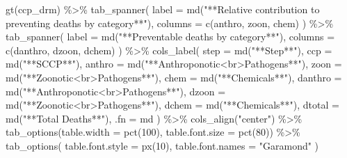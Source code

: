 \documentclass[
  letterpaper,
  DIV=11,
  numbers=noendperiod]{scrartcl}
\newenvironment{Shaded}{\begin{snugshade}}{\end{snugshade}}
\newcommand{\AttributeTok}[1]{\textcolor[rgb]{0.40,0.45,0.13}{#1}}
\newcommand{\DecValTok}[1]{\textcolor[rgb]{0.68,0.00,0.00}{#1}}
\newcommand{\FunctionTok}[1]{\textcolor[rgb]{0.28,0.35,0.67}{#1}}
\newcommand{\NormalTok}[1]{\textcolor[rgb]{0.00,0.23,0.31}{#1}}
\newcommand{\SpecialCharTok}[1]{\textcolor[rgb]{0.37,0.37,0.37}{#1}}
\newcommand{\StringTok}[1]{\textcolor[rgb]{0.13,0.47,0.30}{#1}}
\begin{document}
\begin{Shaded}
\begin{Highlighting}[]
\FunctionTok{gt}\NormalTok{(ccp\_drm) }\SpecialCharTok{\%\textgreater{}\%} 
  \FunctionTok{tab\_spanner}\NormalTok{(}
    \AttributeTok{label =} \FunctionTok{md}\NormalTok{(}\StringTok{"**Relative contribution to preventing deaths by category**"}\NormalTok{),}
    \AttributeTok{columns =} \FunctionTok{c}\NormalTok{(anthro, zoon, chem)}
\NormalTok{  ) }\SpecialCharTok{\%\textgreater{}\%} 
  \FunctionTok{tab\_spanner}\NormalTok{(}
  \AttributeTok{label =} \FunctionTok{md}\NormalTok{(}\StringTok{"**Preventable deaths by category**"}\NormalTok{),}
  \AttributeTok{columns =} \FunctionTok{c}\NormalTok{(danthro, dzoon, dchem)}
\NormalTok{  ) }\SpecialCharTok{\%\textgreater{}\%} 
  \FunctionTok{cols\_label}\NormalTok{(}
\AttributeTok{step =} \FunctionTok{md}\NormalTok{(}\StringTok{"**Step**"}\NormalTok{),}
\AttributeTok{ccp =} \FunctionTok{md}\NormalTok{(}\StringTok{"**SCCP**"}\NormalTok{),}
\AttributeTok{anthro =} \FunctionTok{md}\NormalTok{(}\StringTok{"**Anthroponotic\textless{}br\textgreater{}Pathogens**"}\NormalTok{),}
\AttributeTok{zoon =} \FunctionTok{md}\NormalTok{(}\StringTok{"**Zoonotic\textless{}br\textgreater{}Pathogens**"}\NormalTok{),}
\AttributeTok{chem =} \FunctionTok{md}\NormalTok{(}\StringTok{"**Chemicals**"}\NormalTok{),}
\AttributeTok{danthro =} \FunctionTok{md}\NormalTok{(}\StringTok{"**Anthroponotic\textless{}br\textgreater{}Pathogens**"}\NormalTok{),}
\AttributeTok{dzoon =} \FunctionTok{md}\NormalTok{(}\StringTok{"**Zoonotic\textless{}br\textgreater{}Pathogens**"}\NormalTok{),}
\AttributeTok{dchem =} \FunctionTok{md}\NormalTok{(}\StringTok{"**Chemicals**"}\NormalTok{),}
\AttributeTok{dtotal =} \FunctionTok{md}\NormalTok{(}\StringTok{"**Total Deaths**"}\NormalTok{),}
\AttributeTok{.fn =}\NormalTok{ md}
\NormalTok{) }\SpecialCharTok{\%\textgreater{}\%} 
  \FunctionTok{cols\_align}\NormalTok{(}\StringTok{"center"}\NormalTok{) }\SpecialCharTok{\%\textgreater{}\%} 
\FunctionTok{tab\_options}\NormalTok{(}\AttributeTok{table.width =} \FunctionTok{pct}\NormalTok{(}\DecValTok{100}\NormalTok{), }\AttributeTok{table.font.size =} \FunctionTok{pct}\NormalTok{(}\DecValTok{80}\NormalTok{)) }\SpecialCharTok{\%\textgreater{}\%} 
  \FunctionTok{tab\_options}\NormalTok{(}
    \AttributeTok{table.font.style =} \FunctionTok{px}\NormalTok{(}\DecValTok{10}\NormalTok{),}
    \AttributeTok{table.font.names =} \StringTok{"Garamond"}
\NormalTok{  )}
\end{Highlighting}
\end{Shaded}
\end{document}
